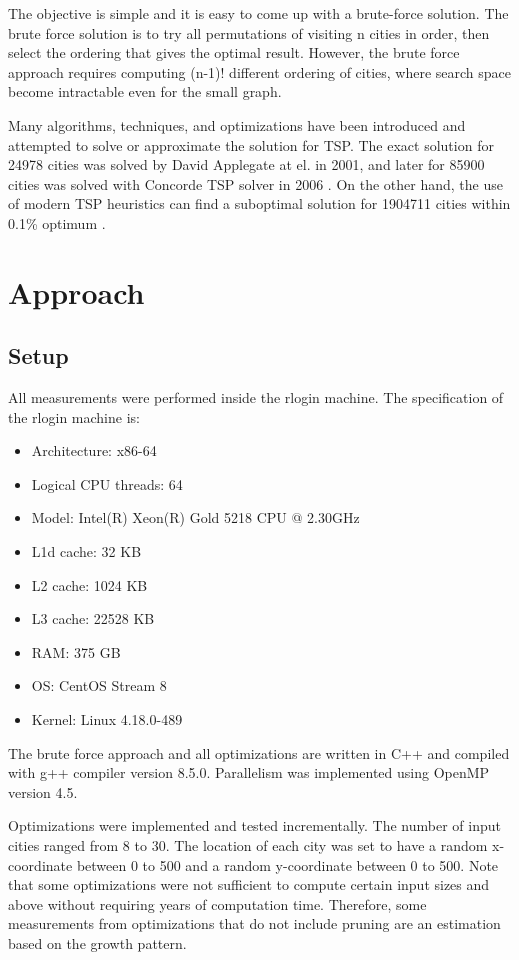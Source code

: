 \documentclass[conference]{IEEEtran}
\begin{document}
The objective is simple and it is easy to come up with a brute-force solution. The brute force solution is to try all permutations of visiting n cities in order, then select the ordering that gives the optimal result. However, the brute force approach requires computing (n-1)! different ordering of cities, where search space become intractable even for the small graph.

Many algorithms, techniques, and optimizations have been introduced and attempted to solve or approximate the solution for TSP. The exact solution for 24978 cities was solved by David Applegate at el. in 2001, and later for 85900 cities was solved with Concorde TSP solver in 2006 \cite{b2}. On the other hand, the use of modern TSP heuristics can find a suboptimal solution for 1904711 cities within 0.1\% optimum \cite{b3}. 


\section{Approach}
\subsection{Setup}
All measurements were performed inside the rlogin machine. The specification of the rlogin machine is:
\begin{itemize}
    \item Architecture: x86-64
    \item Logical CPU threads: 64
    \item Model: Intel(R) Xeon(R) Gold 5218 CPU @ 2.30GHz
    \item L1d cache: 32 KB
    \item L2 cache: 1024 KB
    \item L3 cache: 22528 KB
    \item RAM: 375 GB
    \item OS: CentOS Stream 8
    \item Kernel: Linux 4.18.0-489
\end{itemize}

The brute force approach and all optimizations are written in C++ and compiled with g++ compiler version 8.5.0. Parallelism was implemented using OpenMP version 4.5. 

Optimizations were implemented and tested incrementally. The number of input cities ranged from 8 to 30. The location of each city was set to have a random x-coordinate between 0 to 500 and a random y-coordinate between 0 to 500. Note that some optimizations were not sufficient to compute certain input sizes and above without requiring years of computation time. Therefore, some measurements from optimizations that do not include pruning are an estimation based on the growth pattern.
\end{document}
